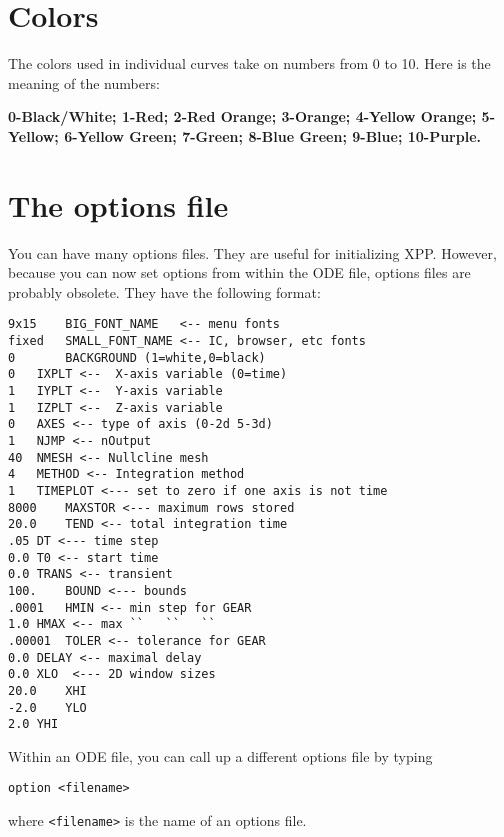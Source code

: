 \documentclass{article}
\newcommand{\bvb}{\begin{verbatim}}
\begin{document}
\section{Colors}
The colors used in individual curves take on numbers from 0 to 10. Here is
the meaning of the numbers:

{\bf 0-Black/White; 1-Red; 2-Red Orange; 3-Orange;
4-Yellow Orange; 5-Yellow; 6-Yellow Green; 7-Green; 8-Blue Green; 9-Blue;
10-Purple.}

\section{The options file}
\label{optfiles}
You can have many options files.  They are useful for initializing
XPP. However, because you can now set options from within the ODE
file, options files are probably obsolete. They have the following format:
\bvb
9x15    BIG_FONT_NAME   <-- menu fonts
fixed   SMALL_FONT_NAME <-- IC, browser, etc fonts
0       BACKGROUND (1=white,0=black)
0	IXPLT <--  X-axis variable (0=time)
1	IYPLT <--  Y-axis variable
1	IZPLT <--  Z-axis variable
0	AXES <-- type of axis (0-2d 5-3d)
1	NJMP <-- nOutput
40	NMESH <-- Nullcline mesh
4	METHOD <-- Integration method
1	TIMEPLOT <--- set to zero if one axis is not time
8000	MAXSTOR <--- maximum rows stored
20.0	TEND <-- total integration time
.05	DT <--- time step
0.0	T0 <-- start time
0.0	TRANS <-- transient
100.	BOUND <--- bounds
.0001	HMIN <-- min step for GEAR
1.0	HMAX <-- max ``   ``   ``
.00001	TOLER <-- tolerance for GEAR
0.0	DELAY <-- maximal delay
0.0	XLO  <--- 2D window sizes
20.0	XHI
-2.0	YLO
2.0	YHI
\end{verbatim}

Within an ODE file, you can call up a different options file by
typing
\bvb
option <filename>
\end{verbatim}
where {\tt <filename>} is the name of an options file.
  
\end{document}
